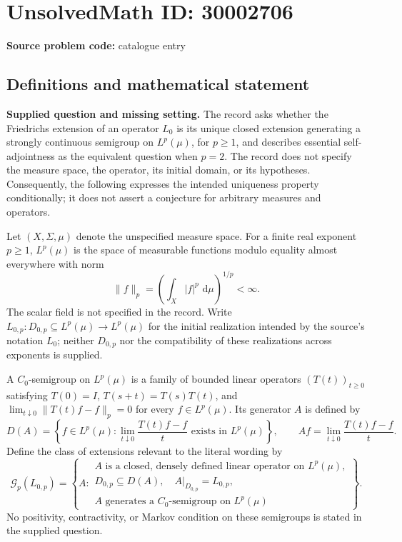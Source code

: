 \documentclass[11pt]{article}
\newcommand{\dd}{\,\mathrm{d}}
\begin{document}
\section*{UnsolvedMath ID: 30002706}
\textbf{Source problem code:} catalogue entry
\subsection{Definitions and mathematical statement}
\textbf{Supplied question and missing setting.} The record asks whether the Friedrichs extension of an operator \(L_0\) is its unique closed extension generating a strongly continuous semigroup on \(L^p(\mu)\), for \(p\geq 1\), and describes essential self-adjointness as the equivalent question when \(p=2\). The record does not specify the measure space, the operator, its initial domain, or its hypotheses. Consequently, the following expresses the intended uniqueness property conditionally; it does not assert a conjecture for arbitrary measures and operators.

Let \((X,\Sigma,\mu)\) denote the unspecified measure space. For a finite real exponent \(p\geq 1\), \(L^p(\mu)\) is the space of measurable functions modulo equality almost everywhere with norm
\[
\|f\|_p=\left(\int_X |f|^p\,\dd\mu\right)^{1/p}<\infty.
\]
The scalar field is not specified in the record. Write \(L_{0,p}:D_{0,p}\subseteq L^p(\mu)\to L^p(\mu)\) for the initial realization intended by the source's notation \(L_0\); neither \(D_{0,p}\) nor the compatibility of these realizations across exponents is supplied.

A \(C_0\)-semigroup on \(L^p(\mu)\) is a family of bounded linear operators \((T(t))_{t\geq0}\) satisfying \(T(0)=I\), \(T(s+t)=T(s)T(t)\), and \(\lim_{t\downarrow0}\|T(t)f-f\|_p=0\) for every \(f\in L^p(\mu)\). Its generator \(A\) is defined by
\[
D(A)=\left\{f\in L^p(\mu):\lim_{t\downarrow0}\frac{T(t)f-f}{t}\text{ exists in }L^p(\mu)\right\},
\qquad
Af=\lim_{t\downarrow0}\frac{T(t)f-f}{t}.
\]
Define the class of extensions relevant to the literal wording by
\[
\mathcal G_p(L_{0,p})=
\left\{A:
\begin{array}{l}
A\text{ is a closed, densely defined linear operator on }L^p(\mu),\\
D_{0,p}\subseteq D(A),\quad A|_{D_{0,p}}=L_{0,p},\\
A\text{ generates a }C_0\text{-semigroup on }L^p(\mu)
\end{array}
\right\}.
\]
No positivity, contractivity, or Markov condition on these semigroups is stated in the supplied question.
\end{document}
